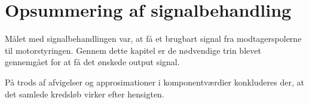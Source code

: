 \section{Opsummering af signalbehandling}\label{sec:delkonklusion_signal}
Målet med signalbehandlingen var, at få et brugbart signal fra modtagerspolerne til motorstyringen. Gennem dette kapitel er de nødvendige trin blevet gennemgået for at få det ønskede output signal.

På trods af afvigelser og approsimationer i komponentværdier konkluderes der, at det samlede kredsløb virker efter hensigten.